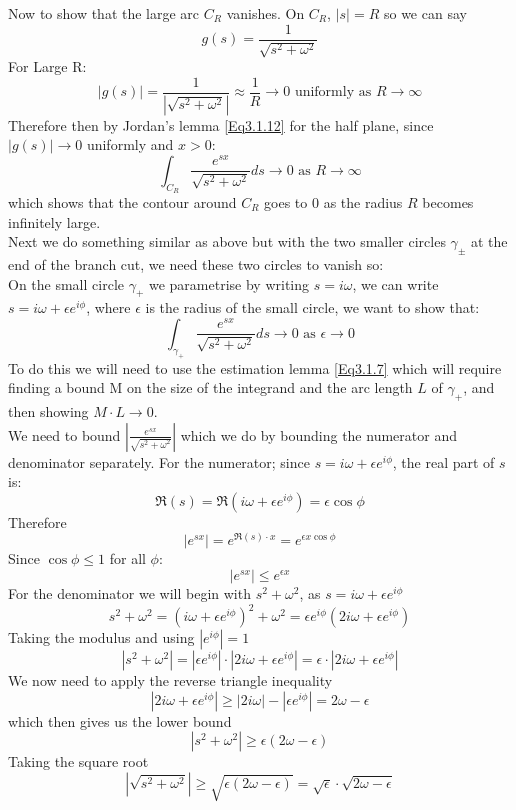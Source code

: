 Now to show that the large arc $C_{R}$ vanishes. On $C_{R}$, $|s|=R$ so we can say $$g(s)=\frac{1}{\sqrt{s^2+\omega^2}}$$ For Large R: $$|g(s)|=\frac{1}{|\sqrt{s^2+\omega^2}|}\approx\frac{1}{R}\rightarrow0 \text{ uniformly as } R\rightarrow\infty$$ Therefore then by Jordan's lemma \ref{Eq3.1.12} for the half plane, since $|g(s)|\to0$ uniformly and $x>0$: 
\begin{equation}
    \int_{C_R}\frac{e^{sx}}{\sqrt{s^2+\omega^2}}ds\to 0 \text{ as } R\to\infty
\end{equation}
which shows that the contour around $C_R$ goes to 0 as the radius $R$ becomes infinitely large. 
\\
Next we do something similar as above but with the two smaller circles $\gamma_{\pm}$ at the end of the branch cut, we need these two circles to vanish so:
\\
On the small circle $\gamma_{+}$ we parametrise by writing $s=i\omega$, we can write $s=i\omega+\epsilon e^{i\phi}$, where $\epsilon$ is the radius of the small circle, we want to show that: 
\begin{equation}
    \int_{\gamma_{+}}\frac{e^{sx}}{\sqrt{s^2+\omega^2}}ds\to0 \text{ as } \epsilon\to 0
\end{equation}
To do this we will need to use the estimation lemma \ref{Eq3.1.7} which will require finding a bound M on the size of the integrand and the arc length $L$ of $\gamma_{+}$, and then showing $M\cdot L\to 0$.
\\
We need to bound $\left|\frac{e^{sx}}{\sqrt{s^2+\omega^2}}\right|$ which we do by bounding the numerator and denominator separately. For the numerator; since $s=i\omega+\epsilon e^{i\phi}$, the real part of $s$ is: $$\Re(s)=\Re(i\omega+\epsilon e^{i\phi})=\epsilon\cos\phi$$ Therefore $$|e^{sx}|=e^{\Re(s)\cdot x}=e^{\epsilon x\cos\phi}$$ Since $\cos\phi\leq1$ for all $\phi$: $$|e^{sx}|\leq e^{\epsilon x}$$ For the denominator we will begin with $s^2+\omega^2$, as $s=i\omega+\epsilon e^{i\phi}$ $$s^2+\omega^2=(i\omega+\epsilon e^{i\phi})^2+\omega^2 = \epsilon e^{i\phi}(2i\omega +\epsilon e^{i\phi})$$ Taking the modulus and using $|e^{i\phi}|=1$ $$|s^2+\omega^2|=|\epsilon e^{i\phi}|\cdot|2i\omega+\epsilon e^{i\phi}|= \epsilon\cdot|2i\omega+\epsilon e^{i\phi}|$$ We now need to apply the reverse triangle inequality $$|2i\omega+\epsilon e^{i\phi}|\geq|2i\omega|-|\epsilon e^{i\phi}|=2\omega-\epsilon$$ which then gives us the lower bound $$|s^2+\omega^2|\geq \epsilon(2\omega-\epsilon)$$ Taking the square root $$|\sqrt{s^2+\omega^2}|\geq\sqrt{\epsilon(2\omega-\epsilon)}=\sqrt{\epsilon}\cdot\sqrt{2\omega-\epsilon}$$ 
